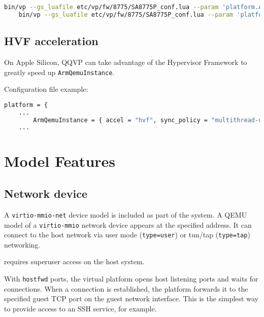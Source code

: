 \small
\begin{lstlisting}[language=bash]
    bin/vp --gs_luafile etc/vp/fw/8775/SA8775P_conf.lua --param 'platform.ArmQemuInstance.args.-d="trace:help"'
    bin/vp --gs_luafile etc/vp/fw/8775/SA8775P_conf.lua --param 'platform.hexagon_cluster_0.HexagonQemuInstance.args.-d="trace:help"'
\end{lstlisting}
\normalsize

\subsection{HVF acceleration}

On Apple Silicon, QQVP can take advantage of the Hypervisor Framework to greatly speed up {\small{\lstinline!ArmQemuInstance!}}.

Configuration file example:

\small
\begin{lstlisting}[language=bash]
    platform = {
    ...
        ArmQemuInstance = { accel = "hvf", sync_policy = "multithread-unconstrained" };
    ...
\end{lstlisting}
\normalsize

\clearpage
\section{Model Features}

\subsection{Network device}

A {\small{\lstinline!virtio-mmio-net!}} device model is included as part of the system. A QEMU model of a {\small{\lstinline!virtio-mmio!}} network device appears at the specified address. It can connect to the host network via user mode ({\small{\lstinline!type=user!}}) or tun/tap ({\small{\lstinline!type=tap!}}) networking.

 requires superuser access on the host system.

With {\small{\lstinline!hostfwd!}} ports, the virtual platform opens host listening ports and waits for connections. When a connection is established, the platform forwards it to the specified guest TCP port on the guest network interface. This is the simplest way to provide access to an SSH service, for example.

